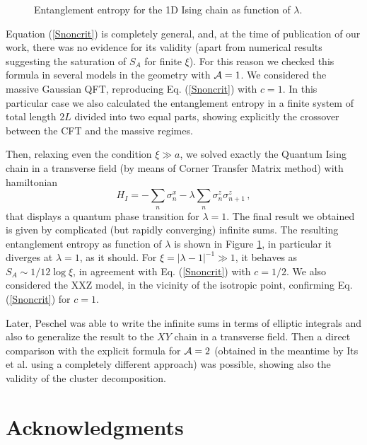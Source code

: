 \documentclass{ws-ijqi}
\def\be{\begin{equation}}
\def\ee{\end{equation}}
\begin{document}
\begin{figure}[t]
\centerline{}
\caption{Entanglement entropy for the 1D Ising chain as function of $\lambda$.
}
\label{Fig}
\end{figure}

Equation (\ref{Snoncrit}) is completely general, and, at the time of 
publication of our work, there was no evidence for its validity (apart
from numerical results\cite{Vidal} suggesting the saturation of $S_A$ for 
finite $\xi$). For this reason we checked this formula in 
several models in the geometry with ${\cal A}=1$. 
We considered the massive Gaussian QFT, reproducing Eq.
(\ref{Snoncrit}) with $c=1$. 
In this particular case we also calculated\cite{cc-04} the entanglement 
entropy in a finite system of total length $2L$ divided into two 
equal parts, showing explicitly the crossover between the CFT and the massive
regimes.

Then, relaxing even the condition $\xi\gg a$, we 
solved exactly the Quantum Ising chain in a transverse field (by means of
Corner Transfer Matrix method\cite{pkl-99}) with hamiltonian
\be
H_I=-\sum_{n}\sigma^x_n-
\lambda  \sum_{n}\sigma^z_n\sigma^z_{n+1}\,,
\label{HamI}
\ee
that displays a quantum phase transition for $\lambda=1$. 
The final result we obtained is given by complicated (but rapidly converging)
infinite sums.\cite{cc-04} 
The resulting entanglement entropy as function of $\lambda$ is shown 
in Figure \ref{Fig}, in particular it diverges at $\lambda=1$, as it should. 
For $\xi=|\lambda-1|^{-1}\gg 1$, it behaves as 
$S_A\sim 1/12 \log\xi$, in agreement with Eq. (\ref{Snoncrit}) with $c=1/2$.
We also considered the XXZ model,\cite{cc-04} in the vicinity of the 
isotropic point, confirming Eq. (\ref{Snoncrit}) for $c=1$.



Later, Peschel\cite{p-05} was able to write the infinite sums in terms of 
elliptic integrals and also to generalize the result to the $XY$ chain 
in a transverse field. 
Then a direct comparison with the explicit formula for ${\cal A}=2$ (obtained
in the meantime by Its et al.\cite{ijk-04} using a completely different
approach) was possible, showing also the validity of the 
cluster decomposition.





\section*{Acknowledgments}
\end{document}
